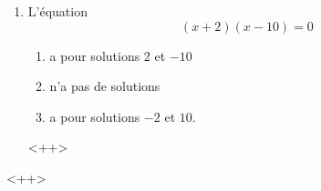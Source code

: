 \begin{exercice}
\begin{multicols}{2}
\begin{enumerate}
\item

    L'équation
    \begin{equation}
        (x+2)(x-10)=0
    \end{equation}
    \begin{enumerate}
        \item
            a pour solutions \( 2\) et \( -10\)
        \item
            n'a pas de solutions
        \item
            a pour solutions \( -2\) et \( 10\).
    \end{enumerate}
    <++>

    \end{enumerate}
    \end{multicols}
    <++>

\end{exercice}
